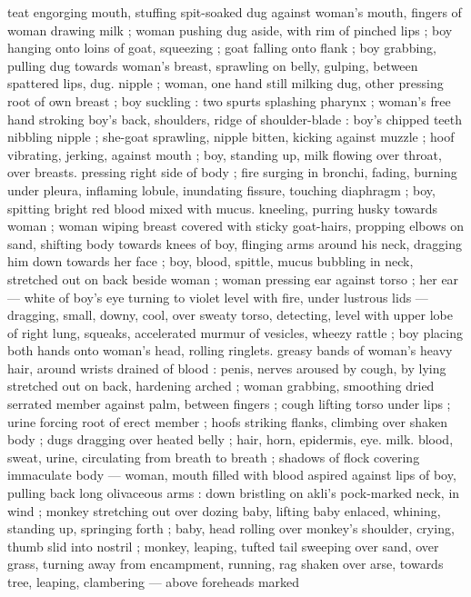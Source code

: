 teat engorging mouth, stuffing spit-soaked dug against woman's 
mouth, fingers of woman drawing milk ; woman pushing dug aside, 
with rim of pinched lips ; boy hanging onto loins of goat, squeezing 
; goat falling onto flank ; boy grabbing, pulling dug towards woman's 
breast, sprawling on belly, gulping, between spattered lips, dug. 
nipple ; woman, one hand still milking dug, other pressing root of 
own breast ; boy suckling : two spurts splashing pharynx ; woman's 
free hand stroking boy's back, shoulders, ridge of shoulder-blade : 
boy's chipped teeth nibbling nipple ; she-goat sprawling, nipple 
bitten, kicking against muzzle ; hoof vibrating, jerking, against 
mouth ; boy, standing up, milk flowing over throat, over breasts. 
pressing right side of body ; fire surging in bronchi, fading, burning 
under pleura, inflaming lobule, inundating fissure, touching 
diaphragm ; boy, spitting bright red blood mixed with mucus. 
kneeling, purring husky towards woman ; woman wiping breast 
covered with sticky goat-hairs, propping elbows on sand, shifting 
body towards knees of boy, flinging arms around his neck, dragging 
him down towards her face ; boy, blood, spittle, mucus bubbling in 
neck, stretched out on back beside woman ; woman pressing ear 
against torso ; her ear --- white of boy's eye turning to violet level 
with fire, under lustrous lids --- dragging, small, downy, cool, over 
sweaty torso, detecting, level with upper lobe of right lung, squeaks, 
accelerated murmur of vesicles, wheezy rattle ; boy placing both 
hands onto woman's head, rolling ringlets. greasy bands of woman's 
heavy hair, around wrists drained of blood : penis, nerves aroused by 
cough, by lying stretched out on back, hardening arched ; woman 
grabbing, smoothing dried serrated member against palm, between 
fingers ; cough lifting torso under lips ; urine forcing root of erect 
member ; hoofs striking flanks, climbing over shaken body ; dugs 
dragging over heated belly ; hair, horn, epidermis, eye. milk. blood, 
sweat, urine, circulating from breath to breath ; shadows of flock 
covering immaculate body --- woman, mouth filled with blood aspired 
against lips of boy, pulling back long olivaceous arms : down bristling 
on akli's pock-marked neck, in wind ; monkey stretching out over 
dozing baby, lifting baby enlaced, whining, standing up, springing 
forth ; baby, head rolling over monkey's shoulder, crying, thumb slid 
into nostril ; monkey, leaping, tufted tail sweeping over sand, over 
grass, turning away from encampment, running, rag shaken over 
arse, towards tree, leaping, clambering --- above foreheads marked 
